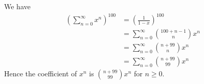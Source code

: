 We have
\begin{align*}
\left( \sum_{n=0}^\infty x^n \right)^{100} 
&= \left( \frac{1}{1 - x} \right)^{100} \\
&= \sum_{n=0}^\infty \binom{100 + n - 1}{n} x^n \\
&= \sum_{n=0}^\infty \binom{n + 99}{n} x^n \\
&= \sum_{n=0}^\infty \binom{n + 99}{99} x^n
\end{align*}
Hence the coefficient of $x^n$ is $\binom{n + 99}{99} x^n$ for $n \geq 0$.
